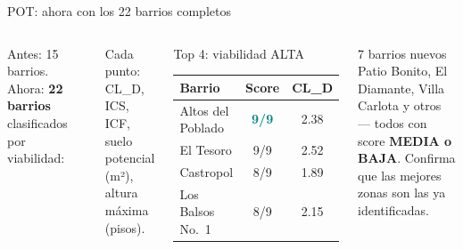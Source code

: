 \documentclass[aspectratio=169, 11pt]{beamer}
\newcommand{\highlight}[1]{\textcolor{teal}{\textbf{#1}}}
\begin{document}
\begin{frame}{POT: ahora con los 22 barrios completos}

\begin{columns}[T]
Antes: 15 barrios. Ahora: \textbf{22 barrios} clasificados por viabilidad:

\vspace{6pt}
\begin{center}
\end{center}

\vspace{4pt}
{\scriptsize Cada punto: CL\_D, ICS, ICF, suelo potencial (m²), altura máxima (pisos).}

\begin{exampleblock}{\small Top 4: viabilidad ALTA}
\footnotesize
\begin{tabular}{@{}lcc@{}}
\toprule
\textbf{Barrio} & \textbf{Score} & \textbf{CL\_D} \\
\midrule
\rowcolor{teal!10}
Altos del Poblado & \highlight{9/9} & 2.38 \\
El Tesoro & 9/9 & 2.52 \\
Castropol & 8/9 & 1.89 \\
Los Balsos No.\ 1 & 8/9 & 2.15 \\
\bottomrule
\end{tabular}
\end{exampleblock}

\vspace{4pt}
\begin{alertblock}{\small 7 barrios nuevos}
\footnotesize Patio Bonito, El Diamante, Villa Carlota y otros --- todos con score \textbf{MEDIA o BAJA}. Confirma que las mejores zonas son las ya identificadas.
\end{alertblock}
\end{columns}
\end{frame}
\end{document}
